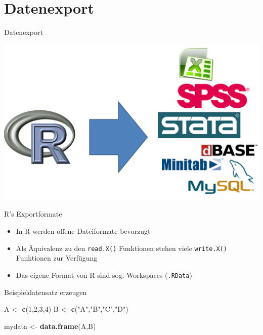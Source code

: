 \documentclass[
  ignorenonframetext,
]{beamer}
\newenvironment{Shaded}{\begin{snugshade}}{\end{snugshade}}
\newcommand{\DecValTok}[1]{\textcolor[rgb]{0.27,0.67,0.26}{#1}}
\newcommand{\KeywordTok}[1]{\textcolor[rgb]{0.26,0.66,0.93}{\textbf{#1}}}
\newcommand{\NormalTok}[1]{\textcolor[rgb]{0.74,0.68,0.62}{#1}}
\newcommand{\StringTok}[1]{\textcolor[rgb]{0.02,0.61,0.04}{#1}}
\providecommand{\tightlist}{%
  \setlength{\itemsep}{0pt}\setlength{\parskip}{0pt}}
\begin{document}
\hypertarget{datenexport}{%
\section{Datenexport}\label{datenexport}}

\begin{frame}{Datenexport}
\protect\hypertarget{datenexport-1}{}

\includegraphics{figure/Datenexport.PNG}

\end{frame}

\begin{frame}[fragile]{R's Exportformate}
\protect\hypertarget{rs-exportformate}{}

\begin{itemize}
\tightlist
\item
  In R werden offene Dateiformate bevorzugt
\item
  Als Äquivalenz zu den \texttt{read.X()} Funktionen stehen viele
  \texttt{write.X()} Funktionen zur Verfügung
\item
  Das eigene Format von R sind sog. Workspaces (\texttt{.RData})
\end{itemize}

\end{frame}

\begin{frame}[fragile]{Beispieldatensatz erzeugen}
\protect\hypertarget{beispieldatensatz-erzeugen}{}

\begin{Shaded}
\begin{Highlighting}[]
\NormalTok{A <-}\StringTok{ }\KeywordTok{c}\NormalTok{(}\DecValTok{1}\NormalTok{,}\DecValTok{2}\NormalTok{,}\DecValTok{3}\NormalTok{,}\DecValTok{4}\NormalTok{)}
\NormalTok{B <-}\StringTok{ }\KeywordTok{c}\NormalTok{(}\StringTok{"A"}\NormalTok{,}\StringTok{"B"}\NormalTok{,}\StringTok{"C"}\NormalTok{,}\StringTok{"D"}\NormalTok{)}

\NormalTok{mydata <-}\StringTok{ }\KeywordTok{data.frame}\NormalTok{(A,B)}
\end{Highlighting}
\end{Shaded}

\end{frame}
\end{document}
